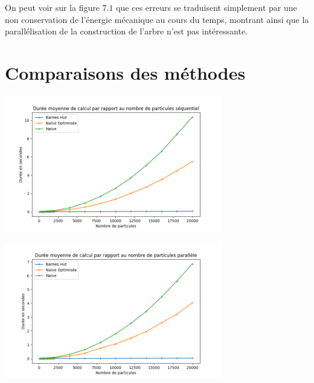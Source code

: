 On peut voir sur la figure $7.1$ que ces erreurs se traduisent simplement par une non conservation de l'énergie mécanique au cours du temps, montrant ainsi que la parallélisation de la construction de l'arbre n'est pas intéressante.

\section{Comparaisons des méthodes}

\begin{minipage}[c]{.46\linewidth}
     \begin{center}
             \includegraphics[width=9.5cm]{./resultats/method_comparison_seq.png}
         \end{center}
   \end{minipage} \hfill
   \begin{minipage}[c]{.46\linewidth}
    \begin{center}
     \includegraphics[width=9.5cm]{./resultats/method_comparison_par.png}
        \end{center}
 \end{minipage}
 
 \begin{center}
 \captionsetup{hypcap=false}
\label{fig12}
 \end{center}

